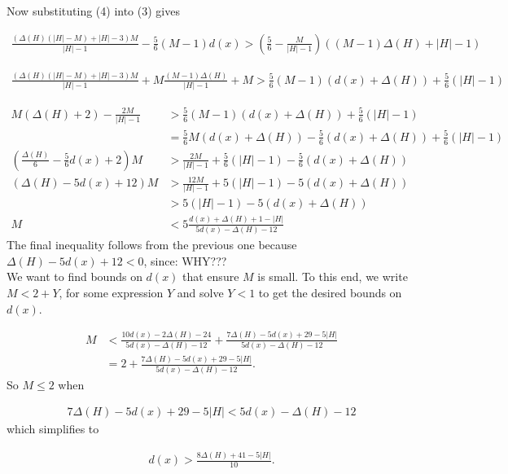 \documentclass[12pt]{amsart}
\theoremstyle{plain}
\theoremstyle{definition}
\theoremstyle{remark}
\begin{document}
Now substituting (4) into (3) gives

\begin{align*}
\frac{(\Delta(H)(|H| - M) + |H| - 3)M}{|H| - 1} - \frac56(M-1)d(x) > \left(\frac56 -
\frac{M}{|H| - 1}\right)((M-1)\Delta(H) + |H| - 1)
\end{align*}

\begin{align*}
\frac{(\Delta(H)(|H| - M) + |H| - 3)M}{|H| - 1} + M\frac{(M-1)\Delta(H) %
}{|H| - 1}+M > \frac56(M-1)(d(x) + \Delta(H)) + \frac56(|H| - 1)
\end{align*}

\begin{align*}
M(\Delta(H) + 2) - \frac{2M}{|H| - 1} &>  \frac56(M-1)(d(x) + \Delta(H)) + \frac56(|H|
- 1) \\
&= \frac56M(d(x) + \Delta(H)) - \frac56(d(x) + \Delta(H)) + \frac56(|H| - 1)\\
\left(\frac{\Delta(H)}6 - \frac56d(x) + 2\right)M &> \frac{2M}{|H| - 1} + 
\frac56(|H| - 1) - \frac56(d(x) + \Delta(H))\\
(\Delta(H) - 5d(x) + 12)M &> \frac{12M}{|H| - 1} +  5(|H| - 1) - 5(d(x) +
\Delta(H))\\ & > 5(|H| - 1) - 5(d(x) + \Delta(H))\\
M &< 5\frac{d(x) + \Delta(H) + 1 - |H|}{5d(x) - \Delta(H) - 12}
\end{align*}
The final inequality follows from the previous one because
$\Delta(H)-5d(x)+12<0$, since: WHY???\\
We want to find bounds on $d(x)$ that ensure $M$ is small.  To this end, we
write $M<2+Y$, for some expression $Y$ and solve $Y<1$ to get the desired bounds
on $d(x)$.

\begin{align*}
M &< \frac{10d(x) - 2\Delta(H) - 24}{5d(x) - \Delta(H) - 12} + \frac{7\Delta(H) -
5d(x) + 29 - 5|H|}{5d(x) - \Delta(H) - 12} \\
&= 2 + \frac{7\Delta(H) - 5d(x) + 29 - 5|H|}{5d(x) - \Delta(H) - 12}.
\end{align*}
So $M\le 2$ when

\begin{align*}
7\Delta(H) - 5d(x) + 29 - 5|H| < 5d(x) - \Delta(H) - 12
\end{align*}
which simplifies to

\begin{align*}
d(x) > \frac{8\Delta(H) + 41 - 5|H|}{10}.
\end{align*}
\end{document}
